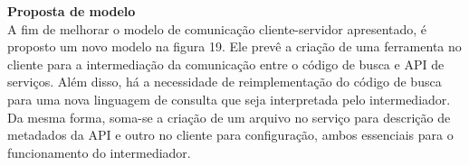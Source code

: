 \textbf{Proposta de modelo} \\

A fim de melhorar o modelo de comunicação cliente-servidor apresentado, é proposto um novo modelo na figura 19. Ele prevê a criação de uma ferramenta no cliente para a intermediação da comunicação entre o código de busca e API de serviços. Além disso, há a necessidade de reimplementação do código de busca para uma nova linguagem de consulta que seja interpretada pelo intermediador. Da mesma forma, soma-se a criação de um arquivo no serviço para descrição de metadados da API e outro no cliente para configuração, ambos essenciais para o funcionamento do intermediador.

\begin{figure}[H]
  \centering
\end{figure}

